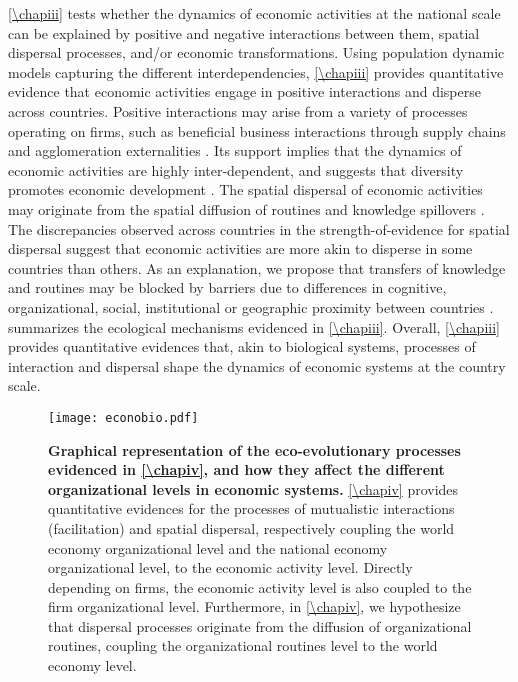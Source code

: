 \cref{\chapiii} tests whether the dynamics of economic activities at the national scale can be explained by positive and negative interactions between them, spatial dispersal processes, and/or economic transformations.
% 
Using population dynamic models capturing the different interdependencies, \cref{\chapiii} provides quantitative evidence that economic activities engage in positive interactions and disperse across countries.
% 
Positive interactions may arise from a variety of processes operating on firms, such as beneficial business interactions through supply chains \citep{Ozman2009,Saavedra2009a} and agglomeration externalities \citep{VanDerPanne2004}. 
% 
Its support implies that the dynamics of economic activities are highly inter-dependent, and suggests that diversity promotes economic development \citep{Hidalgo2018}.
% 
The spatial dispersal of economic activities may originate from the spatial diffusion of routines \citep{Hodgson2004} and knowledge spillovers \citep{Caragliu2016}. The discrepancies observed across countries in the strength-of-evidence for spatial dispersal suggest that economic activities are more akin to disperse in some countries than others. As an explanation, we propose that transfers of knowledge and routines may be blocked by barriers due to differences in cognitive, organizational, social, institutional or geographic proximity between countries \citep{Boschma2005,Caragliu2016}.
% 
 summarizes the ecological mechanisms evidenced in \cref{\chapiii}. Overall, \cref{\chapiii} provides quantitative evidences that, akin to biological systems, processes of interaction and dispersal shape the dynamics of economic systems at the country scale.

\begin{figure}[t]
    \centering
    \texttt{[image: econobio.pdf]}
    \caption{\textbf{Graphical representation of the eco-evolutionary processes evidenced in \cref{\chapiv}, and how they affect the different organizational levels in economic systems.} \cref{\chapiv} provides quantitative evidences for the processes of mutualistic interactions (facilitation) and spatial dispersal, respectively coupling the world economy organizational level and the national economy organizational level, to the economic activity level. Directly depending on firms, the economic activity level is also coupled to the firm organizational level. Furthermore, in \cref{\chapiv}, we hypothesize that dispersal processes originate from the diffusion of organizational routines, coupling the organizational routines level to the world economy level.}
    \label{fig:summary_econobio}
\end{figure}

